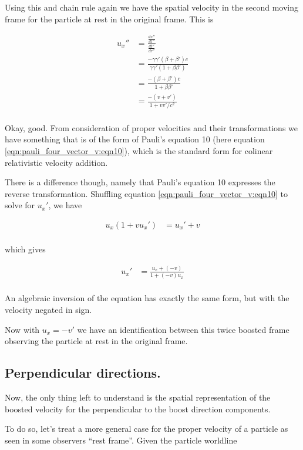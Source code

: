 Using this and chain rule again we have the spatial velocity in the second moving frame for the particle at rest in the original frame.  This is

\begin{align*}
u_x'' 
&=
\frac{\frac{dx''}{dt''}}{ \frac{dt''}{d\tau''} } \\
&=
\frac{-\gamma \gamma' (\beta + \beta') c}{ \gamma \gamma'( 1 + \beta\beta' ) } \\
&=
\frac{-(\beta + \beta') c}{ 1 + \beta\beta' } \\
&=
\frac{-(v + v') }{ 1 + v v'/c^2 } \\
\end{align*}

Okay, good.  From consideration of proper velocities and their transformations we have something that is of
the form of Pauli's equation 10 (here equation \ref{eqn:pauli_four_vector_v:eqn10}), which is the standard form for colinear 
relativistic velocity addition.

There is a difference though, namely that Pauli's equation 10 expresses the reverse transformation.  Shuffling
equation \ref{eqn:pauli_four_vector_v:eqn10} to solve for $u_x'$, we have

\begin{align*}
u_x ( 1 + v {u_x}') &= { {u_x}' + v  } \\
\end{align*}

which gives

\begin{align*}
u_x' &= \frac{ {u_x} + (-v)  }{ 1 + (-v) {u_x}} \\
\end{align*}

An algebraic inversion of the equation has exactly the same form, but with the velocity negated in sign.

Now with $u_x = -v'$ we have an identification between this twice boosted frame observing the particle at
rest in the original frame.

\subsection{Perpendicular directions. }

Now, the only thing left to understand is the spatial representation of the boosted velocity 
for the perpendicular to the boost direction components.

To do so, let's treat a more general case for the proper velocity of a particle as seen in some observers ``rest frame''.  Given the particle worldline

